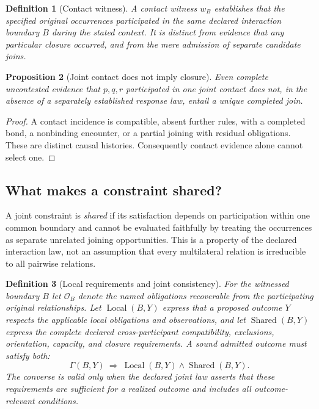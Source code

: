 \documentclass[11pt]{article}
\newtheorem{definition}{Definition}[section]
\newtheorem{proposition}[definition]{Proposition}
\begin{document}
\begin{definition}[Contact witness]
A contact witness $w_B$ establishes that the specified
original occurrences participated in the same declared
interaction boundary $B$ during the stated context. It is
distinct from evidence that any particular closure occurred,
and from the mere admission of separate candidate joins.
\end{definition}

\begin{proposition}[Joint contact does not imply closure]
Even complete uncontested evidence that $p,q,r$ participated
in one joint contact does not, in the absence of a separately
established response law, entail a unique completed join.
\end{proposition}
\begin{proof}
A contact incidence is compatible, absent further rules, with
a completed bond, a nonbinding encounter, or a partial joining
with residual obligations. These are distinct causal histories.
Consequently contact evidence alone cannot select one.
\end{proof}

\subsection{What makes a constraint shared?}
A joint constraint is \emph{shared} if its satisfaction depends
on participation within one common boundary and cannot be
evaluated faithfully by treating the occurrences as separate
unrelated joining opportunities. This is a property of the
declared interaction law, not an assumption that every
multilateral relation is irreducible to all pairwise relations.

\begin{definition}[Local requirements and joint consistency]
For the witnessed boundary $B$ let $\mathcal O_B$ denote
the named obligations recoverable from the participating
original relationships. Let $\operatorname{Local}(B,Y)$ express
that a proposed outcome $Y$ respects the applicable local
obligations and observations, and let
$\operatorname{Shared}(B,Y)$ express the complete declared
cross-participant compatibility, exclusions, orientation,
capacity, and closure requirements. A sound admitted outcome
must satisfy both:
\[
\Gamma(B,Y)\ \Longrightarrow\
\operatorname{Local}(B,Y)\land
\operatorname{Shared}(B,Y).
\]
The converse is valid only when the declared joint law
asserts that these requirements are \emph{sufficient} for a
realized outcome and includes all outcome-relevant conditions.
\end{definition}
\end{document}
